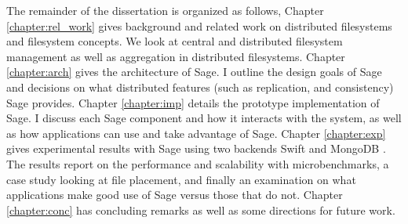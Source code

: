 The remainder of the dissertation is organized as follows, Chapter
\ref{chapter:rel_work} gives background and related work on distributed
filesystems and filesystem concepts. We look at central and distributed
filesystem management as well as aggregation in distributed filesystems.
Chapter \ref{chapter:arch} gives the architecture of Sage. I outline the
design goals of Sage and decisions on what distributed features (such as
replication, and consistency) Sage provides. Chapter \ref{chapter:imp} details
the prototype implementation of Sage. I discuss each Sage component and how it
interacts with the system, as well as how applications can use and take
advantage of Sage. Chapter \ref{chapter:exp} gives experimental results with
Sage using two backends Swift and MongoDB \cite{mongo}. The results report on the
performance and scalability with microbenchmarks, a case study looking at file
placement, and finally an examination on what applications make good use of
Sage versus those that do not. Chapter \ref{chapter:conc} has concluding
remarks as well as some directions for future work.

